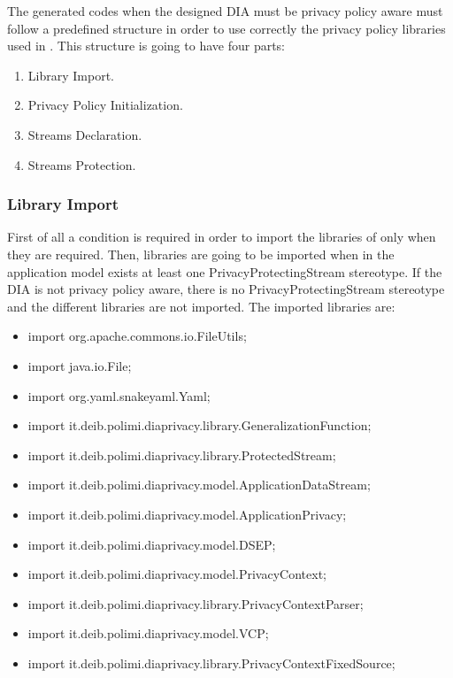 The generated codes when the designed DIA must be privacy policy aware must follow a predefined structure in order to use correctly the privacy policy libraries used in \cite{privacypoliciesarticle}. This structure is going to have four parts:

\begin{enumerate}
\item Library Import.
\item Privacy Policy Initialization.
\item Streams Declaration.
\item Streams Protection.
\end{enumerate}

\subsubsection{Library Import}

First of all  a condition is required in order to import the libraries of \cite{privacypoliciesarticle} only when they are required. Then, libraries are going to be imported when in the application model exists at least one PrivacyProtectingStream stereotype. If the DIA is not privacy policy aware, there is no PrivacyProtectingStream stereotype and the different libraries are not imported. The imported libraries are:

\begin{itemize}
\item import org.apache.commons.io.FileUtils;
\item import java.io.File;
\item import org.yaml.snakeyaml.Yaml;
\item import it.deib.polimi.diaprivacy.library.GeneralizationFunction;
\item import it.deib.polimi.diaprivacy.library.ProtectedStream;
\item import it.deib.polimi.diaprivacy.model.ApplicationDataStream;
\item import it.deib.polimi.diaprivacy.model.ApplicationPrivacy;
\item import it.deib.polimi.diaprivacy.model.DSEP;
\item import it.deib.polimi.diaprivacy.model.PrivacyContext;
\item import it.deib.polimi.diaprivacy.library.PrivacyContextParser;
\item import it.deib.polimi.diaprivacy.model.VCP;
\item import it.deib.polimi.diaprivacy.library.PrivacyContextFixedSource;
\end{itemize}

